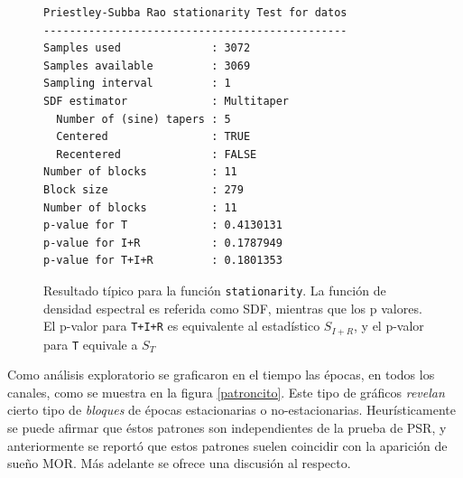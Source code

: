 \begin{figure}
\centering
\begin{lstlisting}[caption={}]
Priestley-Subba Rao stationarity Test for datos
-----------------------------------------------
Samples used              : 3072 
Samples available         : 3069 
Sampling interval         : 1 
SDF estimator             : Multitaper 
  Number of (sine) tapers : 5 
  Centered                : TRUE 
  Recentered              : FALSE 
Number of blocks          : 11 
Block size                : 279 
Number of blocks          : 11 
p-value for T             : 0.4130131 
p-value for I+R           : 0.1787949 
p-value for T+I+R         : 0.1801353 
\end{lstlisting}
\caption[Resultado típico para la función \texttt{stationarity}]
{Resultado típico para la función \texttt{stationarity}. La función de densidad espectral es
referida como SDF, mientras que los p valores. El p-valor para \texttt{T+I+R} es equivalente al 
estadístico $S_{I+R}$, y el p-valor para \texttt{T} equivale a $S_T$
}
\label{res_psr}
\end{figure}

Como análisis exploratorio se graficaron en el tiempo las épocas, en todos los canales, como se 
muestra en la figura \ref{patroncito}. Este tipo de gráficos \textit{revelan} cierto tipo de 
\textit{bloques} de épocas estacionarias o no-estacionarias. Heurísticamente se puede afirmar que 
éstos patrones son independientes de la prueba de PSR, y anteriormente se reportó que estos patrones
suelen coincidir con la aparición de sueño MOR. Más adelante se ofrece una discusión al 
respecto.

